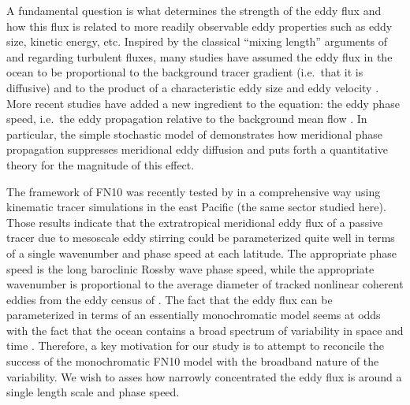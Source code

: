 \documentclass[10pt]{article}
\begin{document}
A fundamental question is what determines the strength of the eddy flux and how this flux is related to more readily observable eddy properties such as eddy size, kinetic energy, etc.
Inspired by the classical ``mixing length'' arguments of \citet{Taylor1915} and \citet{Prandtl1925} regarding turbulent fluxes, many studies have assumed the eddy flux in the ocean to be proportional to the background tracer gradient (i.e.~that it is diffusive) and to the product of a characteristic eddy size and eddy velocity \citep[e.g.][]{Holloway1986,KefferHolloway1988,VisbeckEtAl1997,Stammer1998}. More recent studies have added a new ingredient to the equation: the eddy phase speed, i.e.~the eddy propagation relative to the background mean flow \citep{MarshallEtAl2006,SmithMarshall2009,AbernatheyEtAl2010,FerrariNikurashin2010,KlockerEtAl2012a,KlockerEtAl2012b,AbernatheyMarshall2013}. In particular, the simple stochastic model of \citet[][henceforth FN10]{FerrariNikurashin2010} demonstrates how meridional phase propagation suppresses meridional eddy diffusion and puts forth a quantitative theory for the magnitude of this effect.

The framework of FN10 was recently tested by \citet[][henceforth KA14]{KlockerAbernathey2014} in a comprehensive way using kinematic tracer simulations in the east Pacific (the same sector studied here). Those results indicate that the extratropical meridional eddy flux of a passive tracer due to mesoscale eddy stirring could be parameterized quite well in terms of a single wavenumber and phase speed at each latitude. The appropriate phase speed is the long baroclinic Rossby wave phase speed, while the appropriate wavenumber is proportional to the average diameter of tracked nonlinear coherent eddies from the eddy census of \citet{CheltonEtAl2011}. The fact that the eddy flux can be parameterized in terms of an essentially monochromatic model seems at odds with the fact that the ocean contains a broad spectrum of variability in space and time \citep{WorthamWunsch2014}. Therefore, a key motivation for our study is to attempt to reconcile the success of the monochromatic FN10 model with the broadband nature of the variability. We wish to asses how narrowly concentrated the eddy flux is around a single length scale and phase speed.
\end{document}

